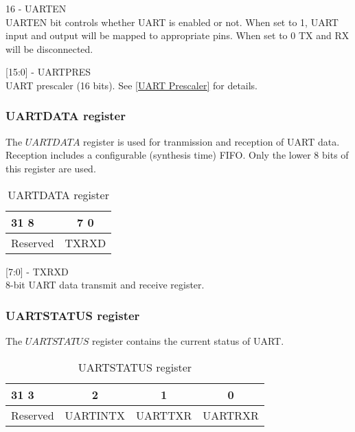 \begin{description}
\item{16 - UARTEN} \hfill \\
UARTEN bit controls whether UART is enabled or not. When set to 1, UART input
and output will be mapped to appropriate pins. When set to 0 TX and RX will be
disconnected.
\item{[15:0] - UARTPRES} \hfill \\
 UART prescaler (16 bits). See \ref{UART Prescaler} for details.
\end{description}


\subsubsection{UARTDATA register}
The $UARTDATA$ register is used for tranmission and reception of UART data. Reception includes a configurable (synthesis time) FIFO.
Only the lower 8 bits of this register are used.

\begin{table}[H]
\begin{center}
\begin{tabularx}{14cm}{Xc}
31 \hfill 8 & 7 \hfill 0  \\
\hline
\multicolumn{1}{|c|}{Reserved} & 
\multicolumn{1}{|c|}{TXRXD} \\
\hline
\end{tabularx}
\caption{UARTDATA register}
\end{center}
\end{table}

\begin{description}
\item{[7:0] - TXRXD} \hfill \\
 8-bit UART data transmit and receive register.
\end{description}

\subsubsection{UARTSTATUS register}

The $UARTSTATUS$ register contains the current status of UART.


\begin{table}[H]
\begin{center}
\begin{tabularx}{14cm}{Xccc}
31 \hfill 3 & 2 & 1 & 0 \\
\hline
\multicolumn{1}{|c|}{Reserved} &
\multicolumn{1}{|c|}{UARTINTX} &
\multicolumn{1}{|c|}{UARTTXR} &
\multicolumn{1}{|c|}{UARTRXR} \\
\hline
\end{tabularx}
\caption{UARTSTATUS register}
\end{center}
\end{table}


